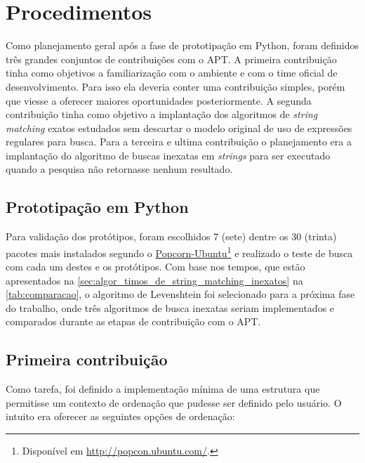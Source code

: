 \section{Procedimentos} %
\label{sec:planejamento_de_contribui_es}

Como planejamento geral após a fase de prototipação em Python, foram definidos três grandes conjuntos de contribuições com o {\code APT}. A primeira contribuição tinha como objetivos a familiarização com o ambiente e com o time oficial de desenvolvimento. Para isso ela deveria conter uma contribuição simples, porém que viesse a oferecer maiores oportunidades posteriormente. A segunda contribuição tinha como objetivo a implantação dos algoritmos de \textit{string matching} exatos estudados sem descartar o modelo original de uso de expressões regulares para busca. Para a terceira e ultima contribuição o planejamento era a implantação do algoritmo de buscas inexatas em \textit{strings} para ser executado quando a pesquisa não retornasse nenhum resultado.


\subsection{Prototipação em Python}

Para validação dos protótipos, foram escolhidos 7 (sete) dentre os 30 (trinta) pacotes mais instalados segundo o \href{http://popcon.ubuntu.com/}{Popcorn-Ubuntu}\footnote{Disponível em \url{http://popcon.ubuntu.com/}.} e realizado o teste de busca com cada um destes e os protótipos. Com base nos tempos, que estão apresentados na \autoref{sec:algor_timos_de_string_matching_inexatos} na \autoref{tab:comparacao}, o algoritmo de Levenshtein foi selecionado para a próxima fase do trabalho, onde três algoritmos de busca inexatas seriam implementados e comparados durante as etapas de contribuição com o APT.

\subsection{Primeira contribuição} %
\label{sec:primeira_contribui_o}

Como tarefa, foi definido a implementação mínima de uma estrutura que permitisse um contexto de ordenação que pudesse ser definido pelo usuário. O intuito era oferecer as seguintes opções de ordenação:


